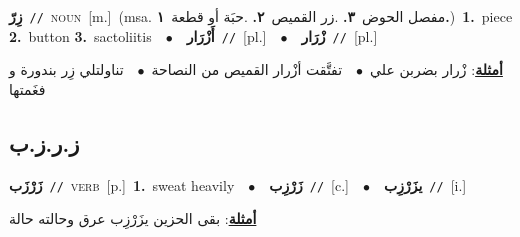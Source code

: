 \documentclass[10pt,a4paper,twoside]{article} %
\begin{document}
\begin{multicols}{2}
{\setlength\topsep{0pt}\textbf{\foreignlanguage{arabic}{زِرّ}}\ {\color{gray}\texttt{//}\color{black}}\ \textsc{noun}\ [m.]\ \color{gray}(msa. \foreignlanguage{arabic}{مفصل الحوض}~\foreignlanguage{arabic}{\textbf{٣.}}  .\foreignlanguage{arabic}{زر القميص}~\foreignlanguage{arabic}{\textbf{٢.}}  .\foreignlanguage{arabic}{حبَة أو قطعة}~\foreignlanguage{arabic}{\textbf{١.}})\color{black}\ \textbf{1.}~piece  \textbf{2.}~button  \textbf{3.}~sactoliitis\ \ $\bullet$\ \ \setlength\topsep{0pt}\textbf{\foreignlanguage{arabic}{أَزْرَار}}\ {\color{gray}\texttt{//}\color{black}}\ [pl.]\ \ $\bullet$\ \ \setlength\topsep{0pt}\textbf{\foreignlanguage{arabic}{زْرَار}}\ {\color{gray}\texttt{//}\color{black}}\ [pl.]\  \begin{flushright}\color{gray}\foreignlanguage{arabic}{\textbf{\underline{\foreignlanguage{arabic}{أمثلة}}}: زْرار بضربن علي\ $\bullet$\ \  تفتَّقت أزْرار القميص من النصاحة\ $\bullet$\ \  تناولتلي زِر بندورة و فغَمتها}\end{flushright}\color{black}} \vspace{2mm}

\vspace{-3mm}
\subsection*{\color{blue}\foreignlanguage{arabic}{ز.ر.ز.ب}\color{blue}{}} 

{\setlength\topsep{0pt}\textbf{\foreignlanguage{arabic}{زَرْزَب}}\ {\color{gray}\texttt{//}\color{black}}\ \textsc{verb}\ [p.]\ \textbf{1.}~sweat heavily\ \ $\bullet$\ \ \setlength\topsep{0pt}\textbf{\foreignlanguage{arabic}{زَرْزِب}}\ {\color{gray}\texttt{//}\color{black}}\ [c.]\ \ $\bullet$\ \ \setlength\topsep{0pt}\textbf{\foreignlanguage{arabic}{يزَرْزِب}}\ {\color{gray}\texttt{//}\color{black}}\ [i.]\  \begin{flushright}\color{gray}\foreignlanguage{arabic}{\textbf{\underline{\foreignlanguage{arabic}{أمثلة}}}: بقى الحزين يزَرْزِب عرق وحالته حالة}\end{flushright}\color{black}} \vspace{2mm}


\end{multicols}
\end{document}

